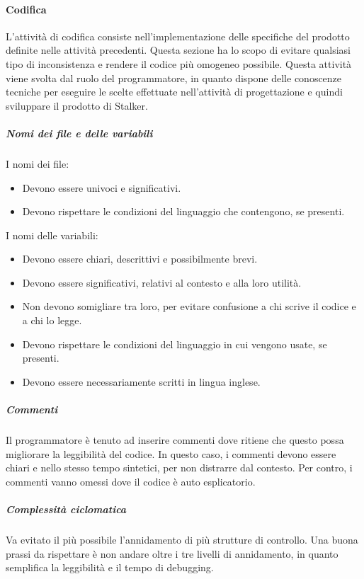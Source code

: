 \documentclass[../../norme-di-progetto.tex]{subfiles}
\begin{document}
\paragraph{Codifica}%
\label{par:codifica}
L'attività di codifica consiste nell'implementazione delle specifiche del prodotto definite nelle attività precedenti.
Questa sezione ha lo scopo di evitare qualsiasi tipo di inconsistenza e rendere il codice più omogeneo possibile.
Questa attività viene svolta dal ruolo del programmatore, in quanto dispone delle conoscenze tecniche per eseguire le scelte effettuate nell'attività di progettazione e quindi sviluppare il prodotto di Stalker.

\subparagraph{Nomi dei file e delle variabili}%
\label{subp:nomi_file_e_variabili}
I nomi dei file:
\begin{itemize}
    \item Devono essere univoci e significativi.
    \item Devono rispettare le condizioni del linguaggio che contengono, se presenti.
\end{itemize}
I nomi delle variabili:
\begin{itemize}
    \item Devono essere chiari, descrittivi e possibilmente brevi.
    \item Devono essere significativi, relativi al contesto e alla loro utilità.
    \item Non devono somigliare tra loro, per evitare confusione a chi scrive il codice e a chi lo legge.
    \item Devono rispettare le condizioni del linguaggio in cui vengono usate, se presenti.
    \item Devono essere necessariamente scritti in lingua inglese.
\end{itemize}

\subparagraph{Commenti}%
\label{subp:commenti}
Il programmatore è tenuto ad inserire commenti dove ritiene che questo possa migliorare la leggibilità del codice.
In questo caso, i commenti devono essere chiari e nello stesso tempo sintetici, per non distrarre dal contesto.
Per contro, i commenti vanno omessi dove il codice è auto esplicatorio.

\subparagraph{Complessità ciclomatica}%
\label{subp:complessita_ciclomatica}
Va evitato il più possibile l’annidamento di più strutture di controllo.
Una buona prassi da rispettare è non andare oltre i tre livelli di annidamento, in quanto semplifica la leggibilità e il tempo di debugging.
\end{document}
